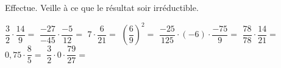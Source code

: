 %
%
Effectue. Veille à ce que le résultat soir irréductible.
  \begin{tasks}
    \task $\dfrac{3}{2} \cdot \dfrac{14}{9}=$
    \task $\dfrac{-27}{-45} \cdot \dfrac{-5}{12}=$
    \task $7 \cdot \dfrac{6}{21}=$
    \task $\left(\dfrac{6}{9}\right)^2=$
    \task $\dfrac{-25}{125} \cdot (-6) \cdot \dfrac{-75}{9}=$
    \task $\dfrac{78}{78} \cdot \dfrac{14}{21}=$
    \task $0,75\cdot \dfrac{8}{5}=$
    \task $\dfrac{3}{2} \cdot 0 \cdot \dfrac{79}{27}=$
  \end{tasks}
